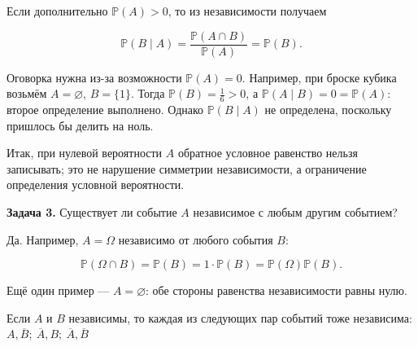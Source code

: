\begin{solution}\label{solution-independent-events-theory-2}
Если дополнительно $\mathbb P(A)>0$, то из независимости получаем

\[\mathbb P(B\mid A)=\frac{\mathbb P(A\cap B)}{\mathbb P(A)}=\mathbb P(B).\]

Оговорка нужна из-за возможности $\mathbb P(A)=0$. Например, при броске кубика возьмём $A=\varnothing$, $B=\{1\}$. Тогда $\mathbb P(B)=\frac16>0$, а $\mathbb P(A\mid B)=0=\mathbb P(A)$: второе определение выполнено. Однако $\mathbb P(B\mid A)$ не определена, поскольку пришлось бы делить на ноль.

Итак, при нулевой вероятности $A$ обратное условное равенство нельзя записывать; это не нарушение симметрии независимости, а ограничение определения условной вероятности.
\end{solution}

\begin{task}\label{task-theory-3}
\textbf{Задача 3.} Существует ли событие $A$ независимое с любым другим событием?
\end{task}

\begin{solution}\label{solution-independent-events-theory-3}
Да. Например, $A=\Omega$ независимо от любого события $B$:

\[\mathbb P(\Omega\cap B)=\mathbb P(B)=1\cdot\mathbb P(B)=\mathbb P(\Omega)\mathbb P(B).\]

Ещё один пример — $A=\varnothing$: обе стороны равенства независимости равны нулю.
\end{solution}

\begin{theorem}\label{theorem-1}
Если $A$ и $B$ независимы, то каждая из следующих пар событий тоже независима: $A, \overline{B};\ \overline{A},B;\ \overline{A}, \overline{B}$
\end{theorem}

